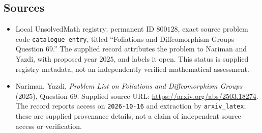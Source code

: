 \documentclass[11pt]{article}
\begin{document}
\subsection{Sources}
\begin{itemize}
\item Local UnsolvedMath registry: permanent ID \(800128\), exact source problem code \texttt{catalogue entry}, titled ``Foliations and Diffeomorphism Groups --- Question 69.'' The supplied record attributes the problem to Nariman and Yazdi, with proposed year \(2025\), and labels it open. This status is supplied registry metadata, not an independently verified mathematical assessment.
\item Nariman, Yazdi, \emph{Problem List on Foliations and Diffeomorphism Groups} (2025), Question 69. Supplied source URL: \url{https://arxiv.org/abs/2503.18274}. The record reports access on \texttt{2026-10-16} and extraction by \texttt{arxiv\_latex}; these are supplied provenance details, not a claim of independent source access or verification.
\end{itemize}
\end{document}
